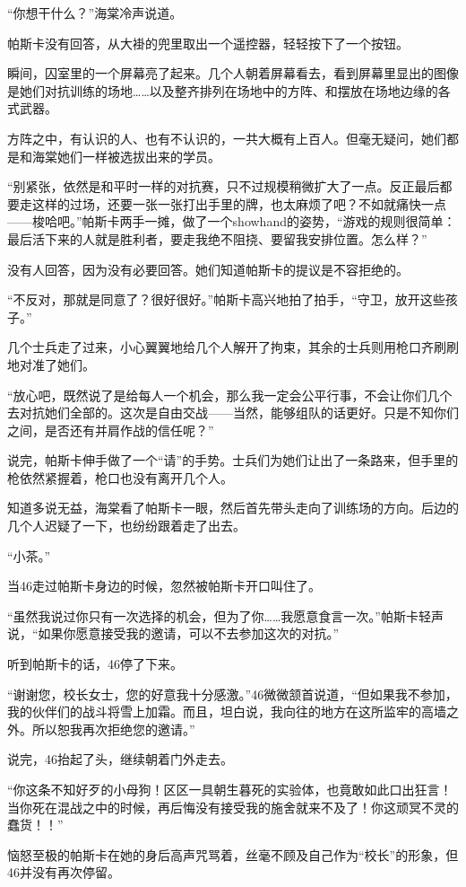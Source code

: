 “你想干什么？”海棠冷声说道。

帕斯卡没有回答，从大褂的兜里取出一个遥控器，轻轻按下了一个按钮。

瞬间，囚室里的一个屏幕亮了起来。几个人朝着屏幕看去，看到屏幕里显出的图像是她们对抗训练的场地……以及整齐排列在场地中的方阵、和摆放在场地边缘的各式武器。

方阵之中，有认识的人、也有不认识的，一共大概有上百人。但毫无疑问，她们都是和海棠她们一样被选拔出来的学员。

“别紧张，依然是和平时一样的对抗赛，只不过规模稍微扩大了一点。反正最后都要走这样的过场，还要一张一张打出手里的牌，也太麻烦了吧？不如就痛快一点——梭哈吧。”帕斯卡两手一摊，做了一个showhand的姿势，“游戏的规则很简单：最后活下来的人就是胜利者，要走我绝不阻挠、要留我安排位置。怎么样？”

没有人回答，因为没有必要回答。她们知道帕斯卡的提议是不容拒绝的。

“不反对，那就是同意了？很好很好。”帕斯卡高兴地拍了拍手，“守卫，放开这些孩子。”

几个士兵走了过来，小心翼翼地给几个人解开了拘束，其余的士兵则用枪口齐刷刷地对准了她们。

“放心吧，既然说了是给每人一个机会，那么我一定会公平行事，不会让你们几个去对抗她们全部的。这次是自由交战——当然，能够组队的话更好。只是不知你们之间，是否还有并肩作战的信任呢？”

说完，帕斯卡伸手做了一个“请”的手势。士兵们为她们让出了一条路来，但手里的枪依然紧握着，枪口也没有离开几个人。

知道多说无益，海棠看了帕斯卡一眼，然后首先带头走向了训练场的方向。后边的几个人迟疑了一下，也纷纷跟着走了出去。

“小茶。”

当46走过帕斯卡身边的时候，忽然被帕斯卡开口叫住了。

“虽然我说过你只有一次选择的机会，但为了你……我愿意食言一次。”帕斯卡轻声说，“如果你愿意接受我的邀请，可以不去参加这次的对抗。”

听到帕斯卡的话，46停了下来。

“谢谢您，校长女士，您的好意我十分感激。”46微微颔首说道，“但如果我不参加，我的伙伴们的战斗将雪上加霜。而且，坦白说，我向往的地方在这所监牢的高墙之外。所以恕我再次拒绝您的邀请。”

说完，46抬起了头，继续朝着门外走去。

“你这条不知好歹的小母狗！区区一具朝生暮死的实验体，也竟敢如此口出狂言！当你死在混战之中的时候，再后悔没有接受我的施舍就来不及了！你这顽冥不灵的蠢货！！”

恼怒至极的帕斯卡在她的身后高声咒骂着，丝毫不顾及自己作为“校长”的形象，但46并没有再次停留。

